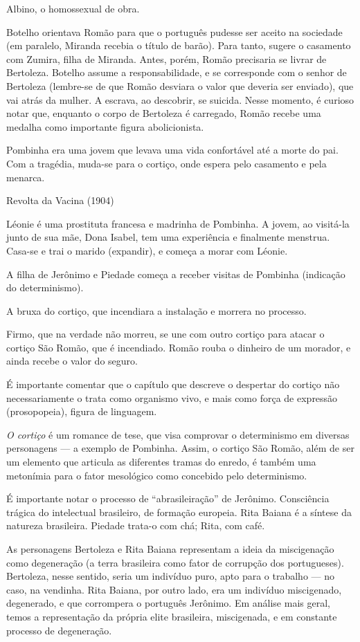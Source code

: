 Albino, o homossexual de obra.

Botelho orientava Romão para que o português pudesse ser aceito na sociedade (em paralelo, Miranda recebia o título de barão). Para tanto, sugere o casamento com Zumira, filha de Miranda. Antes, porém, Romão precisaria se livrar de Bertoleza. Botelho assume a responsabilidade, e se corresponde com o senhor de Bertoleza (lembre-se de que Romão desviara o valor que deveria ser enviado), que vai atrás da mulher. A escrava, ao descobrir, se suicida. Nesse momento, é curioso notar que, enquanto o corpo de Bertoleza é carregado, Romão recebe uma medalha como importante figura abolicionista.

Pombinha era uma jovem que levava uma vida confortável até a morte do pai. Com a tragédia, muda-se para o cortiço, onde espera pelo casamento e pela menarca.

Revolta da Vacina (1904)

Léonie é uma prostituta francesa e madrinha de Pombinha. A jovem, ao visitá-la junto de sua mãe, Dona Isabel, tem uma experiência e finalmente menstrua. Casa-se e trai o marido (expandir), e começa a morar com Léonie.

A filha de Jerônimo e Piedade começa a receber visitas de Pombinha (indicação do determinismo).

A bruxa do cortiço, que incendiara a instalação e morrera no processo.

Firmo, que na verdade não morreu, se une com outro cortiço para atacar o cortiço São Romão, que é incendiado. Romão rouba o dinheiro de um morador, e ainda recebe o valor do seguro.

É importante comentar que o capítulo que descreve o despertar do cortiço não necessariamente o trata como organismo vivo, e mais como força de expressão (prosopopeia), figura de linguagem.

\textit{O cortiço} é um romance de tese, que visa comprovar o determinismo em diversas personagens — a exemplo de Pombinha. Assim, o cortiço São Romão, além de ser um elemento que articula as diferentes tramas do enredo, é também uma metonímia para o fator mesológico como concebido pelo determinismo.

É importante notar o processo de ``abrasileiração'' de Jerônimo. Consciência trágica do intelectual brasileiro, de formação europeia. Rita Baiana é a síntese da natureza brasileira. Piedade trata-o com chá; Rita, com café.

As personagens Bertoleza e Rita Baiana representam a ideia da miscigenação como degeneração (a terra brasileira como fator de corrupção dos portugueses). Bertoleza, nesse sentido, seria um indivíduo puro, apto para o trabalho — no caso, na vendinha. Rita Baiana, por outro lado, era um indivíduo miscigenado, degenerado, e que corrompera o português Jerônimo. Em análise mais geral, temos a representação da própria elite brasileira, miscigenada, e em constante processo de degeneração.

